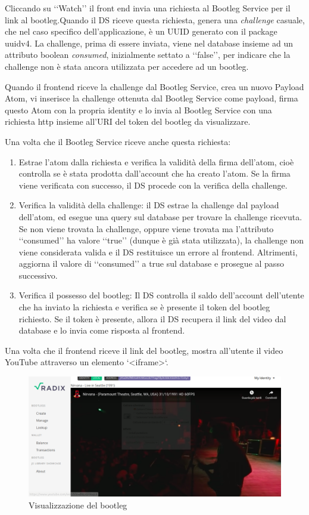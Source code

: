 Cliccando su ‘‘Watch’’ il front end invia una richiesta al Bootleg Service per il link al bootleg.Quando il DS riceve questa richiesta, genera una \textit{challenge} casuale, che nel caso specifico dell'applicazione, è un UUID generato con il package uuidv4. La challenge, prima di essere inviata, viene nel database insieme ad un attributo boolean \textit{consumed}, inizialmente settato a ‘‘false’’, per indicare che la challenge non è stata ancora utilizzata per accedere ad un bootleg. 

Quando il frontend riceve la challenge dal Bootleg Service, crea un nuovo Payload Atom, vi inserisce la challenge ottenuta dal Bootleg Service come payload, firma questo Atom con la propria identity e lo invia al Bootleg Service con una richiesta http insieme all'URI del token del bootleg da visualizzare.

Una volta che il Bootleg Service riceve anche questa richiesta:
\begin{enumerate}
    \item Estrae l'atom dalla richiesta e verifica la validità della firma dell'atom, cioè controlla se è stata prodotta dall'account che ha creato l'atom. Se la firma viene verificata con successo, il DS procede con la verifica della challenge.
    \item Verifica la validità della challenge: il DS estrae la challenge dal payload dell'atom, ed esegue una query sul database per trovare la challenge ricevuta. Se non viene trovata la challenge, oppure viene trovata ma l'attributo ‘‘consumed’’ ha valore ‘‘true’’ (dunque è già stata utilizzata), la challenge non viene considerata valida e il DS restituisce un errore al frontend. Altrimenti, aggiorna il valore di ‘‘consumed’’ a true sul database e prosegue al passo successivo.
    \item Verifica il possesso del bootleg: Il DS controlla il saldo dell'account dell'utente che ha inviato la richiesta e verifica se è presente il token del bootleg richiesto. Se il token è presente, allora il DS recupera il link del video dal database e lo invia come risposta al frontend.
\end{enumerate}

Una volta che il frontend riceve il link del bootleg, mostra all'utente il video YouTube attraverso un elemento `<iframe>`.
\begin{figure}[H]
    \includegraphics[width=\linewidth]{images/application/watch.png}
    \caption{Visualizzazione del bootleg}
    \label{fig:watch}
\end{figure}


